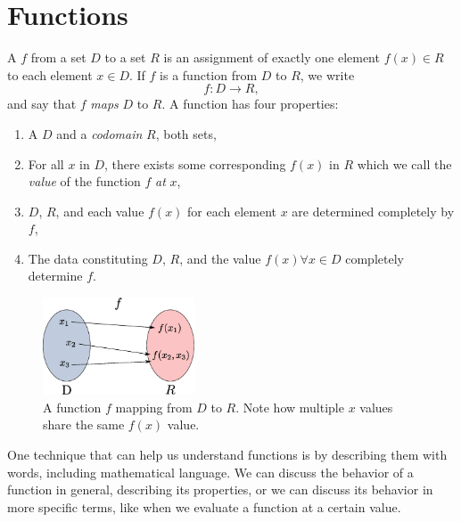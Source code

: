 \chapter{Functions}

\begin{defn}[function]
    A  $f$
    from a set $D$ to a set $R$
    is an assignment of exactly one element
    $f(x) \in R$ to each element $x \in D$.
    If $f$ is a function from $D$ to $R$, we write
    \begin{equation}
        f:D \to R,
        \label{eq:function_definition}
    \end{equation}
    and say that $f$ \emph{maps} $D$ to $R$.
    A function has four properties:
    \begin{enumerate}
        \item A  $D$ and a \emph{codomain} $R$, both sets,
        \item For all $x$ in $D$, there exists some corresponding $f(x)$ in $R$
          which we call the \emph{value} of the function $f$ \emph{at} $x$,
        \item $D$, $R$, and each value $f(x)$ for each element $x$ are
              determined completely by $f$,
        \item The data constituting $D$, $R$, and the value 
              $f(x) \forall x \in D$
              completely determine $f$.
    \end{enumerate}
\begin{figure}
  \centering
  \includegraphics[width=0.4\textwidth]{continuous/functions/function.eps}
  \caption{A function $f$ mapping from $D$ to $R$.
    Note how multiple $x$ values share the same $f(x)$ value.}
  \label{fig:function}
\end{figure}

\end{defn}

One technique that can help us understand functions is by describing them with words,
including mathematical language.
We can discuss the behavior of a function in general,
describing its properties, or we can discuss its behavior in more specific terms,
like when we evaluate a function at a certain value.

